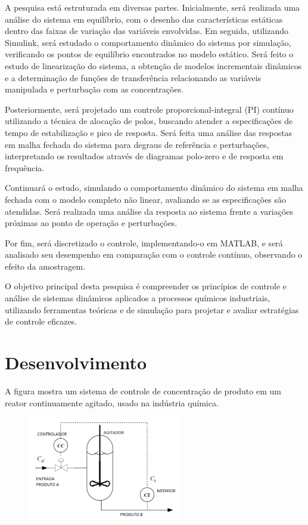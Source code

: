 \documentclass[a4paper,12pt]{report}
\begin{document}
A pesquisa está estruturada em diversas partes. Inicialmente, será realizada uma análise do sistema em equilíbrio, com o desenho das características estáticas dentro das faixas de variação das variáveis envolvidas. Em seguida, utilizando Simulink, será estudado o comportamento dinâmico do sistema por simulação, verificando os pontos de equilíbrio encontrados no modelo estático. Será feito o estudo de linearização do sistema, a obtenção de modelos incrementais dinâmicos e a determinação de funções de transferência relacionando as variáveis manipulada e perturbação com as concentrações.

Posteriormente, será projetado um controle proporcional-integral (PI) contínuo utilizando a técnica de alocação de polos, buscando atender a especificações de tempo de estabilização e pico de resposta. Será feita uma análise das respostas em malha fechada do sistema para degraus de referência e perturbações, interpretando os resultados através de diagramas polo-zero e de resposta em frequência.

Continuará o estudo, simulando o comportamento dinâmico do sistema em malha fechada com o modelo completo não linear, avaliando se as especificações são atendidas. Será realizada uma análise da resposta ao sistema frente a variações próximas ao ponto de operação e perturbações.

Por fim, será discretizado o controle, implementando-o em MATLAB, e será analisado seu desempenho em comparação com o controle contínuo, observando o efeito da amostragem.

O objetivo principal desta pesquisa é compreender os princípios de controle e análise de sistemas dinâmicos aplicados a processos químicos industriais, utilizando ferramentas teóricas e de simulação para projetar e avaliar estratégias de controle eficazes.


\chapter{Desenvolvimento}
\label{chap:desenvolvimento}

A figura mostra um sistema de controle de concentração de produto em um reator continuamente agitado, 
usado na indústria química.


 \begin{figure}[ht]
  \centering
  \includegraphics[width=0.6\textwidth]{Imagens/Reator.png}
  \end{figure}
\end{document}
